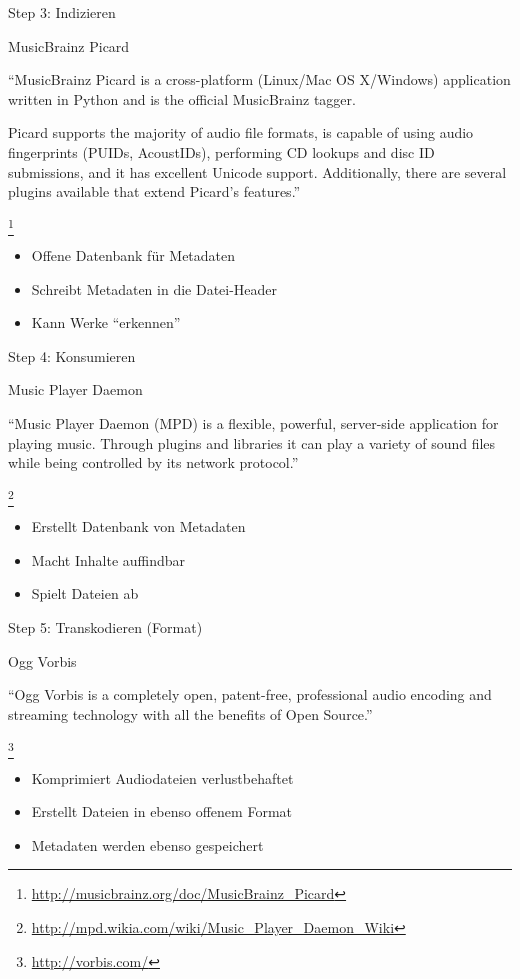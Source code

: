 \documentclass[aspectratio=1610]{beamer}
\newcommand{\src}[1]{
  \raggedright{
    \footnote{
      \small{\url{#1}}
    }
  }
}
\newcommand{\concept}[2]{
  \begin{block}{#1}
    \pause
    #2
  \end{block}
}
\begin{document}
  \begin{frame}{Step 3: Indizieren}
    \concept{MusicBrainz Picard}{
      “MusicBrainz Picard is a cross-platform (Linux/Mac OS X/Windows)
      application written in Python and is the official MusicBrainz tagger.

      Picard supports the majority of audio file formats, is capable of using
      audio fingerprints (PUIDs, AcoustIDs), performing CD lookups and disc ID
      submissions, and it has excellent Unicode support. Additionally, there are
      several plugins available that extend Picard's
      features.”\src{http://musicbrainz.org/doc/MusicBrainz\_Picard}
    }
    \begin{itemize}
      \pause
      \item Offene Datenbank für Metadaten
      \pause
      \item Schreibt Metadaten in die Datei-Header
      \pause
      \item Kann Werke “erkennen”
    \end{itemize}
  \end{frame}

  \begin{frame}{Step 4: Konsumieren}
    \concept{Music Player Daemon}{
      “Music Player Daemon (MPD) is a flexible, powerful, server-side
      application for playing music. Through plugins and libraries it can play a
      variety of sound files while being controlled by its network
      protocol.”\src{http://mpd.wikia.com/wiki/Music\_Player\_Daemon\_Wiki}
    }
    \begin{itemize}
      \pause
      \item Erstellt Datenbank von Metadaten
      \pause
      \item Macht Inhalte auffindbar
      \pause
      \item Spielt Dateien ab
    \end{itemize}
  \end{frame}

  \begin{frame}{Step 5: Transkodieren (Format)}
    \concept{Ogg Vorbis}{
      “Ogg Vorbis is a completely open, patent-free, professional audio encoding
      and streaming technology with all the benefits of Open
      Source.”\src{http://vorbis.com/}
    }
    \begin{itemize}
      \pause
      \item Komprimiert Audiodateien verlustbehaftet
      \pause
      \item Erstellt Dateien in ebenso offenem Format
      \pause
      \item Metadaten werden ebenso gespeichert
    \end{itemize}
  \end{frame}
\end{document}
